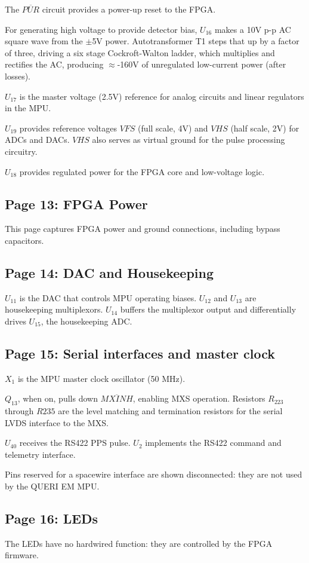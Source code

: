 \documentclass[11pt]{article}
\begin{document}
The $\overline{PUR}$ circuit provides a power-up reset to the FPGA.

For generating high voltage to provide detector bias, $U_{16}$ makes a 10V p-p AC square wave from the $\pm$5V power. Autotransformer T1 steps that up by a factor of three, driving a six stage Cockroft-Walton ladder, which multiplies and rectifies the AC, producing $\approx$-160V of unregulated low-current power (after losses).

$U_{17}$ is the master voltage (2.5V) reference for analog circuits and linear regulators in the MPU.

$U_{19}$ provides reference voltages $VFS$ (full scale, 4V) and $VHS$ (half scale, 2V) for ADCs and DACs. $VHS$ also serves as virtual ground for the pulse processing circuitry.

$U_{18}$ provides regulated power for the FPGA core and low-voltage logic.

\subsection{Page 13: FPGA Power}
This page captures FPGA power and ground connections, including bypass capacitors.

\subsection{Page 14: DAC and Housekeeping}
$U_{11}$ is the DAC that controls MPU operating biases. $U_{12}$ and $U_{13}$ are housekeeping multiplexors. $U_{14}$ buffers the multiplexor output and differentially drives $U_{15}$, the housekeeping ADC.

\subsection{Page 15: Serial interfaces and master clock}
$X_1$ is the MPU master clock oscillator (50 MHz).

$Q_{13}$, when on, pulls down $\overline{MXINH}$, enabling MXS operation. Resistors $R_{223}$ through $R{235}$ are the level matching and termination resistors for the serial LVDS interface to the MXS.

$U_{40}$ receives the RS422 PPS pulse. $U_2$ implements the RS422 command and telemetry interface.

Pins reserved for a spacewire interface are shown disconnected: they are not used by the QUERI EM MPU.

\subsection{Page 16: LEDs}
The LEDs have no hardwired function: they are controlled by the FPGA firmware. 
\end{document}
